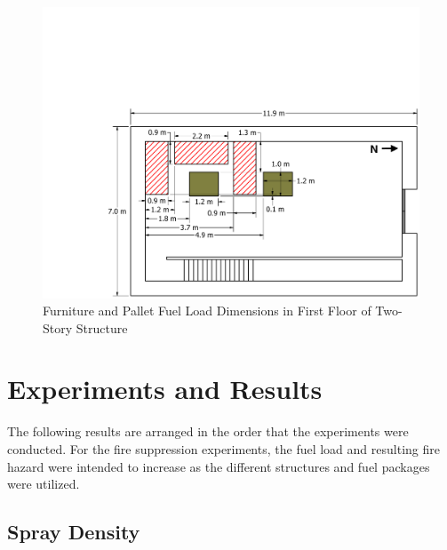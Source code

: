 \documentclass[12pt,oneside]{book}
\begin{document}
\begin{figure}[!ht]
	\includegraphics[width=\columnwidth]{../../DelCo_2014_2015/Drawings/PDFs/CAFS/West_Structure_1st_Floor_Furniture_Pallets}
	\caption{Furniture and Pallet Fuel Load Dimensions in First Floor of Two-Story Structure}
	\label{fig:pallet_furniture_2story}
\end{figure}

\chapter{Experiments and Results}
\label{chap:Experiments_and_Results}

The following results are arranged in the order that the experiments were conducted. For the fire suppression experiments, the fuel load and resulting fire hazard were intended to increase as the different structures and fuel packages were utilized.  

\section{Spray Density}
\label{sec:Spray_Density}
\end{document}
